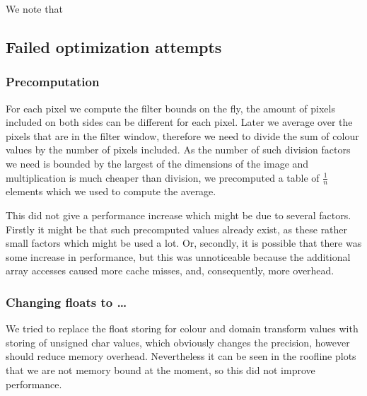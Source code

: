 
We note that 

\subsection{Failed optimization attempts}

\subsubsection{Precomputation} 

For each pixel we compute the filter bounds on the fly, the amount of pixels included on both sides can be different for each pixel. Later we average over the pixels that are in the filter window, therefore we need to divide the sum of colour values by the number of pixels included. As the number of such division factors we need is bounded by the largest of the dimensions of the image and multiplication is much cheaper than division, we precomputed a table of $\frac{1}{n}$ elements which we used to compute the average.

This did not give a performance increase which might be due to several factors. Firstly it might be that such precomputed values already exist, as these rather small factors which might be used a lot. Or, secondly, it is possible that there was some increase in performance, but this was unnoticeable because the additional array accesses caused more cache misses, and, consequently, more overhead.

\subsubsection{Changing floats to \dots}


We tried to replace the float storing for colour and domain transform values with storing of unsigned char values, which obviously changes the precision, however should reduce memory overhead. Nevertheless it can be seen in the roofline plots that we are not memory bound at the moment, so this did not improve performance.



